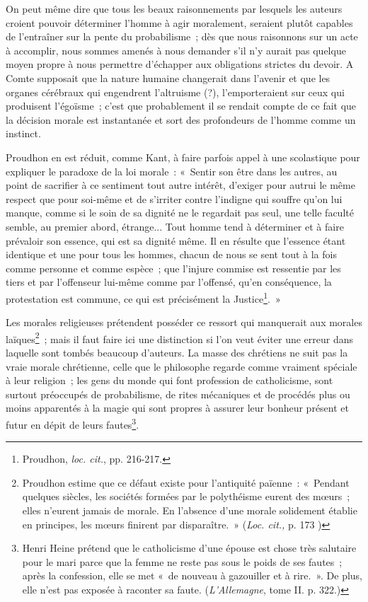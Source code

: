 \documentclass[french,twoside]{book} %
\begin{document}
On peut même dire que tous les beaux raisonnements  par lesquels les auteurs croient pouvoir déterminer l’homme à agir moralement, seraient plutôt capables de l’entraîner sur la pente du probabilisme ; dès que nous raisonnons sur un acte à accomplir, nous sommes amenés à nous demander s’il n’y aurait pas quelque moyen propre à nous permettre d’échapper aux obligations strictes du devoir. A Comte supposait que la nature humaine changerait dans l’avenir et que les organes cérébraux qui engendrent l’altruisme (?), l’emporteraient sur ceux qui produisent l’égoïsme ; c’est que probablement il se rendait compte de ce fait que la décision morale est instantanée et sort des profondeurs de l’homme comme un instinct.\par
Proudhon en est réduit, comme Kant, à faire parfois appel à une scolastique pour expliquer le paradoxe de la loi morale : « Sentir son être dans les autres, au point de sacrifier à ce sentiment tout autre intérêt, d’exiger pour autrui le même respect que pour soi-même et de s’irriter contre l’indigne qui souffre qu’on lui manque, comme si le soin de sa dignité ne le regardait pas seul, une telle faculté semble, au premier abord, étrange... Tout homme tend à déterminer et à faire prévaloir son essence, qui est sa dignité même. Il en résulte que l’essence étant identique et une pour tous les hommes, chacun de nous se sent tout à la fois comme personne et comme espèce ; que l’injure commise est ressentie par les tiers et par l’offenseur lui-même comme par l’offensé, qu’en conséquence, la protestation est commune, ce qui est précisément la Justice\footnote{ \noindent Proudhon, \emph{loc. cit.}, pp. 216-217.
 }. »\par
 Les morales religieuses prétendent posséder ce ressort qui manquerait aux morales laïques\footnote{ \noindent Proudhon estime que ce défaut existe pour l’antiquité païenne : « Pendant quelques siècles, les sociétés formées par le polythéisme eurent des mœurs ; elles n’eurent jamais de morale. En l’absence d’une morale solidement établie en principes, les mœurs finirent par disparaître. » (\emph{Loc. cit.,} p. 173 )
 } ; mais il faut faire ici une distinction si l’on veut éviter une erreur dans laquelle sont tombés beaucoup d’auteurs. La masse des chrétiens ne suit pas la vraie morale chrétienne, celle que le philosophe regarde comme vraiment spéciale à leur religion ; les gens du monde qui font profession de catholicisme, sont surtout préoccupés de probabilisme, de rites mécaniques et de procédés plus ou moins apparentés à la magie qui sont propres à assurer leur bonheur présent et futur en dépit de leurs fautes\footnote{ \noindent Henri Heine prétend que le catholicisme d’une épouse est chose très salutaire pour le mari parce que la femme ne reste pas sous le poids de ses fautes ; après la confession, elle se met « de nouveau à gazouiller et à rire. ». De plus, elle n’est pas exposée à raconter sa faute. (\emph{L’Allemagne}, tome II. p. 322.)
 }.\par
\end{document}
